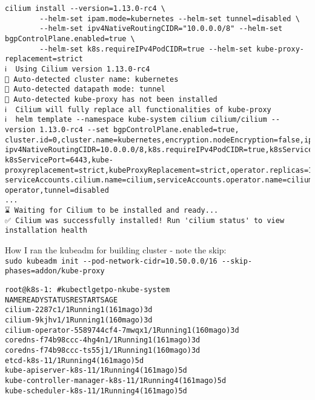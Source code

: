 \documentclass[Screen16to9,17pt]{foils}
\begin{document}
\begin{verbatim}
cilium install --version=1.13.0-rc4 \
		--helm-set ipam.mode=kubernetes --helm-set tunnel=disabled \
		--helm-set ipv4NativeRoutingCIDR="10.0.0.0/8" --helm-set bgpControlPlane.enabled=true \
		--helm-set k8s.requireIPv4PodCIDR=true --helm-set kube-proxy-replacement=strict
ℹ️  Using Cilium version 1.13.0-rc4
🔮 Auto-detected cluster name: kubernetes
🔮 Auto-detected datapath mode: tunnel
🔮 Auto-detected kube-proxy has not been installed
ℹ️  Cilium will fully replace all functionalities of kube-proxy
ℹ️  helm template --namespace kube-system cilium cilium/cilium --version 1.13.0-rc4 --set bgpControlPlane.enabled=true,
cluster.id=0,cluster.name=kubernetes,encryption.nodeEncryption=false,ipam.mode=kubernetes,
ipv4NativeRoutingCIDR=10.0.0.0/8,k8s.requireIPv4PodCIDR=true,k8sServiceHost=10.137.0.26,
k8sServicePort=6443,kube-proxyreplacement=strict,kubeProxyReplacement=strict,operator.replicas=1,
serviceAccounts.cilium.name=cilium,serviceAccounts.operator.name=cilium-operator,tunnel=disabled
...
⌛ Waiting for Cilium to be installed and ready...
✅ Cilium was successfully installed! Run 'cilium status' to view installation health
\end{verbatim}


How I ran the kubeadm for building cluster - note the skip:\\
\verb+sudo kubeadm init --pod-network-cidr=10.50.0.0/16 --skip-phases=addon/kube-proxy+

\slide{After install Cilium}

\begin{alltt}\footnotesize
root@k8s-1:~# kubectl get po -n kube-system
NAME                               READY   STATUS    RESTARTS       AGE
cilium-2287c                       1/1     Running   1 (161m ago)   3d
cilium-9kjhv                       1/1     Running   1 (160m ago)   3d
cilium-operator-5589744cf4-7mwqx   1/1     Running   1 (160m ago)   3d
coredns-f74b98ccc-4hg4n            1/1     Running   1 (161m ago)   3d
coredns-f74b98ccc-ts55j            1/1     Running   1 (160m ago)   3d
etcd-k8s-1                         1/1     Running   4 (161m ago)   5d
kube-apiserver-k8s-1               1/1     Running   4 (161m ago)   5d
kube-controller-manager-k8s-1      1/1     Running   4 (161m ago)   5d
kube-scheduler-k8s-1               1/1     Running   4 (161m ago)   5d
\end{alltt}



\end{document}
